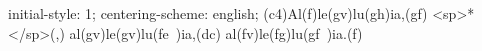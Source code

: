 initial-style: 1;
centering-scheme: english;
(c4)Al(f)le(gv)lu(gh)ia,(gf) <sp>*</sp>(,) al(gv)le(gv)lu(fe~)ia,(dc) al(fv)le(fg)lu(gf~)ia.(f)
